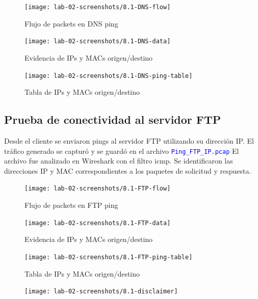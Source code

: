 \documentclass[10pt]{article}
\begin{document}
\begin{figure}[H]
    \centering
    \texttt{[image: lab-02-screenshots/8.1-DNS-flow]}
    \caption{Flujo de packets en DNS ping}
\end{figure}


\begin{figure}[H]
    \centering
    \texttt{[image: lab-02-screenshots/8.1-DNS-data]}
    \caption{Evidencia de IPs y MACs origen/destino}
\end{figure}

\begin{figure}[H]
    \centering
    \texttt{[image: lab-02-screenshots/8.1-DNS-ping-table]}
    \caption{Tabla de IPs y MACs origen/destino}
\end{figure}


\subsection{Prueba de conectividad al servidor FTP}

Desde el cliente se enviaron pings al servidor FTP utilizando su dirección IP. El tráfico generado se capturó y se guardó en el archivo \textcolor{blue}{\texttt{Ping\_FTP\_IP.pcap}} El archivo fue analizado en Wireshark con el filtro icmp. Se identificaron las direcciones IP y MAC correspondientes a los paquetes de solicitud y respuesta.

\begin{figure}[H]
    \centering
    \texttt{[image: lab-02-screenshots/8.1-FTP-flow]}
    \caption{Flujo de packets en FTP ping}
\end{figure}


\begin{figure}[H]
    \centering
    \texttt{[image: lab-02-screenshots/8.1-FTP-data]}
    \caption{Evidencia de IPs y MACs origen/destino}
\end{figure}

\begin{figure}[H]
    \centering
    \texttt{[image: lab-02-screenshots/8.1-FTP-ping-table]}
    \caption{Tabla de IPs y MACs origen/destino}
\end{figure}

\begin{figure}[H]
    \centering
    \texttt{[image: lab-02-screenshots/8.1-disclaimer]}
\end{figure}

\renewcommand{\thesection}{8.\arabic{section}}
\end{document}
